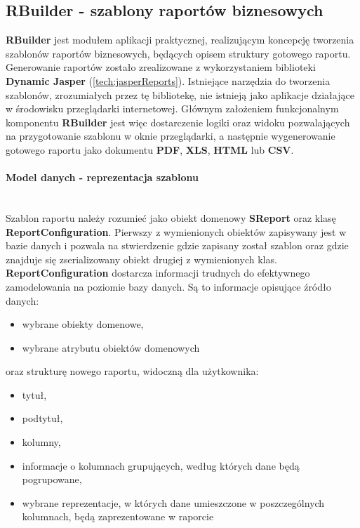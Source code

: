 	\clearpage
		
\subsection{RBuilder - szablony raportów biznesowych}
	\textbf{RBuilder} jest modułem aplikacji praktycznej, realizującym koncepcję tworzenia szablonów raportów biznesowych, będących opisem struktury gotowego raportu. Generowanie raportów zostało zrealizowane z wykorzystaniem biblioteki \textbf{Dynamic Jasper} (\ref{tech:jasperReports}). Istniejące narzędzia do tworzenia szablonów, zrozumiałych przez tę bibliotekę, nie istnieją jako aplikacje działające w środowisku przeglądarki internetowej. Głównym założeniem funkcjonalnym komponentu \textbf{RBuilder} jest więc dostarczenie logiki oraz widoku pozwalających na przygotowanie szablonu w oknie przeglądarki, a następnie wygenerowanie gotowego raportu jako dokumentu \textbf{PDF}, \textbf{XLS}, \textbf{HTML} lub \textbf{CSV}.
	
	\paragraph{Model danych - reprezentacja szablonu}   \hspace{0pt} \\
	Szablon raportu należy rozumieć jako obiekt domenowy \textbf{SReport} oraz klasę \textbf{ReportConfiguration}. Pierwszy z wymienionych obiektów zapisywany jest w bazie danych i pozwala na stwierdzenie gdzie zapisany został szablon oraz gdzie znajduje się zserializowany obiekt drugiej z wymienionych klas. \textbf{ReportConfiguration} dostarcza informacji trudnych do efektywnego zamodelowania na poziomie bazy danych. Są to informacje opisujące źródło danych:
	\begin{itemize}
		\item wybrane obiekty domenowe,
		\item wybrane atrybutu obiektów domenowych	
	\end{itemize}	 
	oraz strukturę nowego raportu, widoczną dla użytkownika:
	\begin{itemize}
		\item tytuł,
		\item podtytuł,
		\item kolumny,
		\item informacje o kolumnach grupujących, według których dane będą pogrupowane,
		\item wybrane reprezentacje, w których dane umieszczone w poszczególnych kolumnach, będą zaprezentowane w raporcie
	\end{itemize}
	
